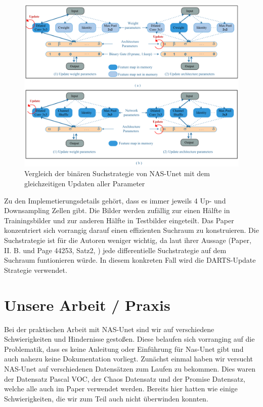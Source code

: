 \begin{figure}[H]
	
	\centering
	\includegraphics[scale=0.7]{Pictures/nasUnet/Bild4.png}
	\caption{Vergleich der binären Suchstrategie von NAS-Unet mit dem gleichzeitigen Updaten aller Parameter \cite{nasunetPaper} }
	\label{pic:nasUnet_binäreSuchstrategie}
\end{figure}

Zu den Implemetierungsdetails gehört, dass es immer jeweils 4 Up- und Downsampling Zellen gibt. Die Bilder werden zufällig zur einen Hälfte in Trainingsbilder und zur anderen Hälfte in Testbilder eingeteilt. 
Das Paper konzentriert sich vorrangig darauf einen effizienten Suchraum zu konstruieren. Die Suchstrategie ist für die Autoren weniger wichtig, da laut ihrer Aussage (Paper, II. B. \cite{nasunetPaper} und Page 44253, Satz2, \cite{nasunetPaper}) jede differentielle Suchstrategie auf dem Suchraum funtionieren würde. In diesem konkreten Fall wird die DARTS-Update Strategie verwendet. 

\section{Unsere Arbeit / Praxis}

Bei der praktischen Arbeit mit NAS-Unet sind wir auf verschiedene Schwierigkeiten und Hindernisse gestoßen. Diese belaufen sich vorranging auf die Problematik, dass es keine Anleitung oder Einführung für Nas-Unet gibt und auch nahezu keine Dokumentation vorliegt. 
Zunächst einmal haben wir versucht NAS-Unet auf verschiedenen Datensätzen zum Laufen zu bekommen. Dies waren der Datensatz Pascal VOC, der Chaos Datensatz und der Promise Datensatz, welche alle auch im Paper verwendet werden. Bereits hier hatten wie einige Schwierigkeiten, die wir zum Teil auch nicht überwinden konnten. 

